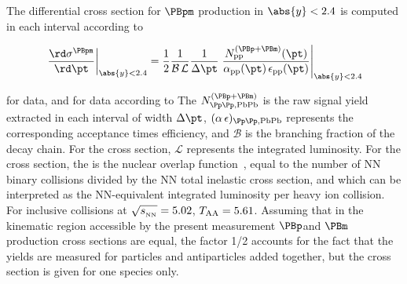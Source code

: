 The differential cross section for $\PBpm$ production in $\abs{y}<2.4$ is computed in each \pt interval according to
\begin{linenomath}
\begin{equation}
  \left.\frac{{\rd}\sigma^{\PBpm}}{{\rd}\pt}\right|_{\abs{y}<2.4} =
  \frac{1}{2} \frac{1}{\mathcal{B} \, \mathcal{L}} \frac{1}{\Delta\pt} \left.\frac{N^{(\PBp+\PBm)}_{\rm pp}(\pt)}{\alpha_{\rm pp}(\pt) \, \epsilon_{\rm pp}(\pt)}\right|_{\abs{y}<2.4}
  \label{eq:crosssectionDpPb}
\end{equation}
\end{linenomath}
for \pp data, and for \PbPb data according to
The $N^{(\PBp+\PBm)}_{\pp, \PbPb}$ is the raw signal yield extracted in each \pt interval of width $\Delta \pt$, $(\alpha \, \epsilon)_{\pp, \PbPb}$ represents the corresponding acceptance times efficiency, and $\mathcal{B}$ is the branching fraction of the decay chain. For the \pp cross section, $\mathcal{L}$ represents the integrated luminosity. For the \PbPb cross section, the \TAA is the nuclear overlap function~\cite{Miller:2007ri}, equal to the number of NN binary collisions divided by the NN total inelastic cross section, and which can be interpreted as the NN-equivalent integrated luminosity per heavy ion collision. For inclusive \PbPb collisions at $\sqrtsNN=5.02$\TeV, $T_{\mathrm{AA}} = 5.61$\mbinv. Assuming that in the kinematic region accessible by the present measurement $\PBp$and $\PBm$ production cross sections are equal, the factor 1/2 accounts for the fact that the yields are measured for particles and antiparticles added together, but the cross section is given for one species only.

